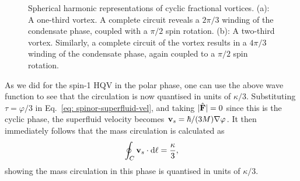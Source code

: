 \begin{figure}
    \centering
    \caption[Spherical harmonic representation of cyclic fractional vortices]
    {\label{fig: cyclic-fractional-spherical}Spherical harmonic
        representations of cyclic fractional vortices.
        (a): A one-third vortex. A complete circuit reveals a \(2\pi/3\)
        winding of the condensate phase, coupled with a \(\pi/2\) spin rotation.
        (b): A two-third vortex. Similarly, a complete circuit of the
        vortex results in a \(4\pi/3\) winding of the condensate phase, again
        coupled to a \(\pi/2\) spin rotation.}
\end{figure}
As we did for the spin-1 HQV in the polar phase, one can use the above wave
function to see that the circulation is now quantised in units of
\(\kappa / 3\).
Substituting \(\tau=\varphi/3\) in Eq.~\eqref{eq: spinor-superfluid-vel}, and
taking \(|\hat{\vb{F}}|=0\) since this is the cyclic phase, the superfluid
velocity becomes \(\vb{v}_s=\hbar/(3M)\nabla\varphi \).
It then immediately follows that the mass circulation is calculated as
\begin{align}
    \oint_C \vb{v}_s \cdot \dd \vb{\ell} = \frac{\kappa}{3},
\end{align}
showing the mass circulation in this phase is quantised in units of
\(\kappa / 3\).